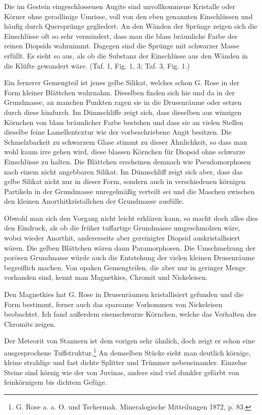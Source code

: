 \documentclass[a4paper, 11pt, oneside, polutonikogreek, german]{article}
\begin{document}
Die im Gestein eingeschlossenen Augite sind unvollkommene Kristalle oder Körner ohne geradlinige Umrisse, voll von den eben genannten Einschlüssen und häufig durch Quersprünge gegliedert. An den Wänden der Sprünge zeigen sich die Einschlüsse oft so sehr vermindert, dass man die blass bräunliche Farbe des reinen Diopsids wahrnimmt. Dagegen sind die Sprünge mit schwarzer Masse erfüllt. Es sieht so aus, als ob die Substanz der Einschlüsse aus den Wänden in die Klüfte gewandert wäre. (Taf. 1, Fig. 1, 3; Taf. 3, Fig. 1.)

Ein fernerer Gemengteil ist jenes gelbe Silikat, welches schon G. Rose in der Form kleiner Blättchen wahrnahm. Dieselben finden sich hie und da in der Grundmasse, an manchen Punkten ragen sie in die Drusenräume oder setzen durch diese hindurch. Im Dünnschliffe zeigt sich, dass dieselben aus winzigen Körnchen von blass bräunlicher Farbe bestehen und dass sie an vielen Stellen dieselbe feine Lamellentextur wie der vorbeschriebene Augit besitzen. Die Schmelzbarkeit zu schwarzem Glase stimmt zu dieser Ähnlichkeit, so dass man wohl kaum irre gehen wird, diese blassen Körnchen für Diopsid ohne schwarze Einschlüsse zu halten. Die Blättchen erscheinen demnach wie Pseudomorphosen nach einem nicht angebbaren Silikat. Im Dünnschliff zeigt sich aber, dass das gelbe Silikat nicht nur in dieser Form, sondern auch in verschiedenen körnigen Partikeln in der Grundmasse unregelmäßig verteilt sei und die Maschen zwischen den kleinen Anorthitkristallchen der Grundmasse ausfülle.

Obwohl man sich den Vorgang nicht leicht erklären kann, so macht doch alles dies den Eindruck, als ob die früher tuffartige Grundmasse umgeschmolzen wäre, wobei wieder Anorthit, andererseits aber gereinigter Diopsid auskristallisiert wären. Die gelben Blättchen wären dann Paramorphosen. Die Umschmelzung der porösen Grundmasse würde auch die Entstehung der vielen kleinen Drusenräume begreiflich machen. Von opaken Gemengteilen, die aber nur in geringer Menge vorhanden sind, kennt man Magnetkies, Chromit und Nickeleisen.

Den Magnetkies hat G. Rose in Drusenräumen kristallisiert gefunden und die Form bestimmt, ferner auch das sparsame Vorkommen von Nickeleisen beobachtet. Ich fand außerdem eisenschwarze Körnchen, welche das Verhalten des Chromits zeigen.

Der Meteorit von Stannern ist dem vorigen sehr ähnlich, doch zeigt er schon eine ausgesprochene Tuffstruktur.\footnote{G. Rose a. a. O. und Tschermak. Mineralogische Mitteilungen 1872, p. 83.} An demselben Stücke sieht man deutlich körnige, kleine strahlige und fast dichte Splitter und Trümmer nebeneinander. Einzelne Steine sind körnig wie der von Juvinas, andere sind viel dunkler gefärbt von feinkörnigem bis dichtem Gefüge.
\end{document}
